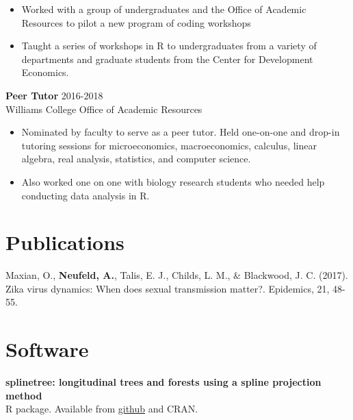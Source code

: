 \documentclass[margin, 10pt]{res} %
\begin{document}
\begin{resume}
{\begin{itemize}
\item Worked with a group of undergraduates and the Office of Academic Resources to pilot a new program of coding workshops
\item Taught a series of workshops in R to undergraduates from a variety of departments and graduate students from the Center for Development Economics. 
\end{itemize}
{\textbf{Peer Tutor}} \hfill 2016-2018 \\
Williams College Office of Academic Resources
\begin{itemize}
\item Nominated by faculty to serve as a peer tutor. Held one-on-one and drop-in tutoring sessions for microeconomics, macroeconomics, calculus, linear algebra, real analysis, statistics, and computer science. 
\item Also worked one on one with biology research students who needed help conducting data analysis in R. 
\end{itemize}


\section{Publications} 
Maxian, O., \textbf{Neufeld, A.}, Talis, E. J., Childs, L. M., \& Blackwood, J. C. (2017). Zika virus dynamics: When does sexual transmission matter?. Epidemics, 21, 48-55.

 
\section{Software} 
\textbf{splinetree: longitudinal trees and forests using a spline projection method} \\
R package. Available from \href{https://github.com/anna-neufeld/splinetree}{github} and CRAN. 


}
\end{resume}
\end{document}
